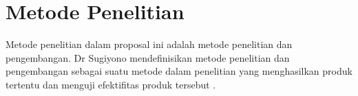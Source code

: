 \section{Metode Penelitian}

Metode penelitian dalam proposal ini adalah metode penelitian dan pengembangan. Dr Sugiyono mendefinisikan metode penelitian dan pengembangan sebagai suatu metode dalam penelitian yang menghasilkan produk tertentu dan menguji efektifitas produk tersebut \cite{sugiyono2013metode}.